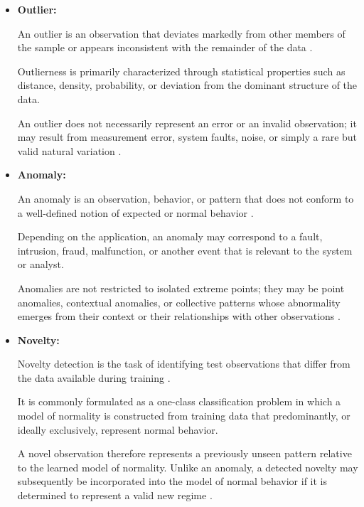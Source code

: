 \documentclass{book}
\begin{document}
\begin{itemize}

        \item \textbf{Outlier:}

        An outlier is an observation that deviates markedly from other members
        of the sample or appears inconsistent with the remainder of the data
        \cite{hodge-austin-2004-a-survey-of-outlier-detection-methodologies}.

        Outlierness is primarily characterized through statistical properties
        such as distance, density, probability, or deviation from the dominant
        structure of the data.

        An outlier does not necessarily represent an error or an invalid
        observation; it may result from measurement error, system faults, noise,
        or simply a rare but valid natural variation
        \cite{hodge-austin-2004-a-survey-of-outlier-detection-methodologies}.

        \item \textbf{Anomaly:}

        An anomaly is an observation, behavior, or pattern that does not conform
        to a well-defined notion of expected or normal behavior
        \cite{chandola-banerjee-kumar-2009-anomaly-detection-a-survey}.

        Depending on the application, an anomaly may correspond to a fault,
        intrusion, fraud, malfunction, or another event that is relevant to the
        system or analyst.

        Anomalies are not restricted to isolated extreme points; they may be
        point anomalies, contextual anomalies, or collective patterns whose
        abnormality emerges from their context or their relationships with other
        observations
        \cite{chandola-banerjee-kumar-2009-anomaly-detection-a-survey}.

        \item \textbf{Novelty:}

        Novelty detection is the task of identifying test observations that
        differ from the data available during training
        \cite{pimentel-clifton-clifton-tarassenko-2014-a-review-of-novelty-detection}.

        It is commonly formulated as a one-class classification problem in which a model of normality is constructed from training data that predominantly, or ideally exclusively, represent normal behavior.

        A novel observation therefore represents a previously unseen pattern relative to the learned model of normality. Unlike an anomaly, a detected
        novelty may subsequently be incorporated into the model of normal behavior if it is determined to represent a valid new regime \cite{pimentel-clifton-clifton-tarassenko-2014-a-review-of-novelty-detection,chandola-banerjee-kumar-2009-anomaly-detection-a-survey}.

    \end{itemize}
\end{document}
